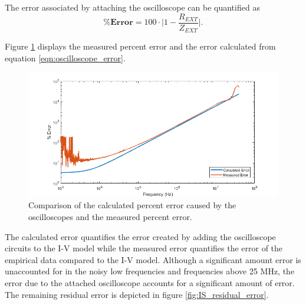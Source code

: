\par The error associated by attaching the oscilloscope can be quantified as
\begin{equation}
    \pmb{\%} \textbf{Error} = 100 \cdot \bigg| 1 - \frac{R_{EXT}}{Z_{EXT}}\bigg|.
    \label{eqn:oscilloscope_error}
\end{equation}

\par Figure \ref{fig:test_circ_measurement_error} displays the measured percent error and the error calculated from equation \ref{eqn:oscilloscope_error}. 


\begin{figure}[H]{\textwidth}
    \centering
    \includegraphics[width=\textwidth]{images/percentError.png}
    \caption{Comparison of the calculated percent error caused by the oscilloscopes and the measured percent error.}
    \label{fig:test_circ_measurement_error}
\end{figure}

\par The calculated error quantifies the error created by adding the oscilloscope circuits to the I-V model while the measured error quantifies the error of the empirical data compared to the I-V model.  Although a significant amount error is unaccounted for in the noisy low frequencies and frequencies above 25 MHz, the error due to the attached oscilloscope accounts for a significant amount of error.  The remaining residual error is depicted in figure \ref{fig:IS_residual_error}.

